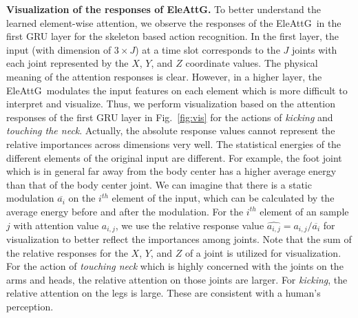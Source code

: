 \documentclass[runningheads]{llncs}
\newcommand{\EleAttGn}{{EleAttG}}
\newcommand{\EleAttG}{{EleAttG~}}
\begin{document}
\noindent\textbf{Visualization of the responses of \EleAttGn.} To better understand the learned element-wise attention, we observe the responses of the \EleAttG in the first GRU layer for the skeleton based action recognition. In the first layer, the input (with dimension of $3\times J$) at a time slot corresponds to the $J$ joints with each joint represented by the $X$, $Y$, and $Z$ coordinate values. The physical meaning of the attention responses is clear. However, in a higher layer, the \EleAttG modulates the input features on each element which is more difficult to interpret and visualize. Thus, we perform visualization based on the attention responses of the first GRU layer in Fig.~\ref{fig:vis} for the actions of \emph{kicking} and \emph{touching the neck}. 
Actually, the absolute response values cannot represent the relative importances across dimensions very well. The statistical energies of the different elements of the original input are different. For example, the foot joint which is in general far away from the body center has a higher average energy than that of the body center joint. We can imagine that there is a static modulation $\overline{a_i}$ on the $i^{th}$ element of the input, which can be calculated by the average energy before and after the modulation. For the $i^{th}$ element of an sample $j$ with attention value $a_{i,j}$, we use the relative response value $\widehat{a_{i,j}} = a_{i,j}/\overline{a_i}$ for visualization to better reflect the importances among joints. Note that the sum of the relative responses for the $X$, $Y$, and $Z$ of a joint is utilized for visualization. For the action of \emph{touching neck}  which is highly concerned with the joints on the arms and heads, the relative attention on those joints are larger. For \emph{kicking}, the relative attention on the legs is large. These are consistent with a human's perception.  
\end{document}
